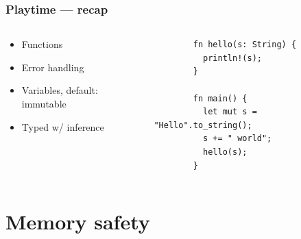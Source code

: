 \documentclass[aspectratio=169]{beamer}
\begin{document}
\begin{frame}[fragile]
  \frametitle{Playtime --- recap}

  \begin{columns}

    \begin{column}{.4\linewidth}
      \begin{itemize}
      \item Functions
      \item Error handling
      \item Variables, default: immutable
      \item Typed w/ inference
      \end{itemize}
    \end{column}

    \begin{column}{.6\linewidth}
      \begin{verbatim}
        fn hello(s: String) {
          println!(s);
        }

        fn main() {
          let mut s = "Hello".to_string();
          s += " world";
          hello(s);
        }
      \end{verbatim}
    \end{column}
  \end{columns}
\end{frame}


\section{Memory safety}
\frame{\sectionpage}
\end{document}
